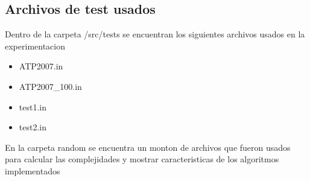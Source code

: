 \subsection{Archivos de test usados}
Dentro de la carpeta /src/tests se encuentran los siguientes archivos usados en la experimentacion
\begin{itemize}
 \item ATP2007.in
 \item ATP2007_100.in
 \item test1.in
 \item test2.in
\end{itemize}

En la carpeta random se encuentra un monton de archivos que fueron usados
para calcular las complejidades y mostrar caracteristicas de los algoritmos implementados

